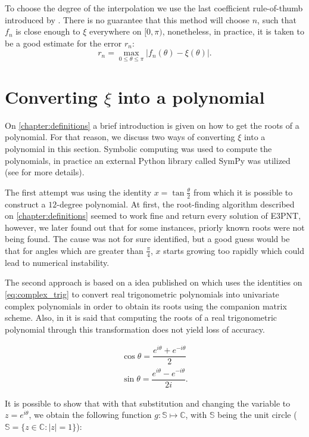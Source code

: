 To choose the degree of the interpolation we use the last coefficient rule-of-thumb introduced by . There is no guarantee that this method will choose $n$, such that $f_n$ is close enough to $\xi$ everywhere on $[0, \pi)$, nonetheless, in practice, it is taken to be a good estimate for the error $r_n$:
\begin{equation}
r_n = \max_{0 \le \theta \le \pi} |f_n(\theta) - \xi(\theta)|.
\end{equation}


\section{Converting $\xi$ into a polynomial}

On \autoref{chapter:definitions} a brief introduction is given on how to get the roots of a polynomial. For that reason, we discuss two ways of converting $\xi$ into a polynomial in this section. Symbolic computing was used to compute the polynomials, in practice an external Python library called SymPy was utilized (see  for more details).

The first attempt was using the identity $x = \tan{\frac{\theta}{2}}$ from which it is possible to construct a $12$-degree polynomial. At first,  the root-finding algorithm described on \autoref{chapter:definitions} seemed to work fine and return every solution of E3PNT, however, we later found out that for some instances, priorly known roots were not being found. The cause was not for sure identified, but a good guess would be that for angles which are greater than $\frac{\pi}{4}$, $x$ starts growing too rapidly which could lead to numerical instability.

The second approach is based on a idea published on  which uses the identities on \autoref{eq:complex_trig} to convert real trigonometric polynomials into univariate complex polynomials in order to obtain its roots using the companion matrix scheme.
Also, in  it is said that computing the roots of a real trigonometric polynomial through this transformation does not yield loss of accuracy.

\begin{align}\label{eq:complex_trig}
\cos{\theta} = \dfrac{e^{i\theta} + e^{-i\theta}}{2}\\
\sin{\theta} = \dfrac{e^{i\theta} - e^{-i\theta}}{2i}.
\end{align}

It is possible to show that with that substitution and changing the variable to $z=e^{i\theta}$, we obtain the following function $g : \mathbb{S} \mapsto \mathbb{C}$, with $\mathbb{S}$ being the unit circle ($\mathbb{S} = \{z \in \mathbb{C} : |z|=1\}$):


